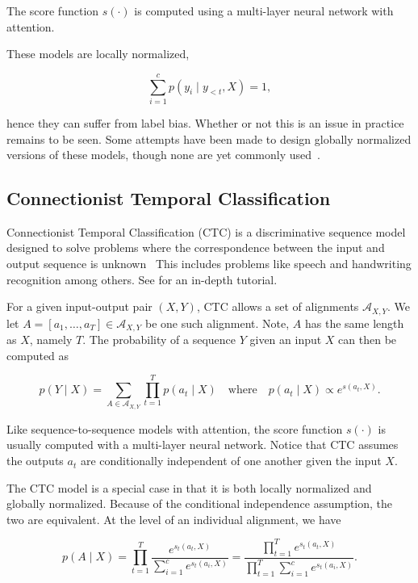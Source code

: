 \documentclass[11pt, letterpaper]{article}
\newcommand{\A}{\mathcal{A}}
\begin{document}
The score function $s(\cdot)$ is computed using a multi-layer neural network
with attention.

These models are locally normalized,

\begin{equation}
\sum_{i=1}^c p(y_i \mid y_{<t}, X) = 1,
\end{equation}

hence they can suffer from label bias. Whether or not this is an issue in
practice remains to be seen. Some attempts have been made to design globally
normalized versions of these models, though none are yet commonly
used~\citep{wiseman2016}.

\subsection{Connectionist Temporal Classification}

Connectionist Temporal Classification (CTC) is a discriminative sequence model
designed to solve problems where the correspondence between the input and
output sequence is unknown~\citep{graves2006} This includes problems like speech
and handwriting recognition among others. See \citet{hannun2017} for an
in-depth tutorial.

For a given input-output pair $(X, Y)$, CTC allows a set of alignments
$\A_{X,Y}$. We let $A\!=\![a_1, \ldots, a_T] \in \A_{X,Y}$ be one such alignment.
Note, $A$ has the same length as $X$, namely $T$. The probability of a sequence
$Y$ given an input $X$ can then be computed as

\begin{equation}
    p(Y \mid X) = \sum_{A \in \A_{X,Y}} \prod_{t=1}^T p(a_t \mid X)
     \quad \textrm{where} \quad p(a_t \mid X) \propto e^{s(a_t, X)}.
\end{equation}

Like sequence-to-sequence models with attention, the score function $s(\cdot)$
is usually computed with a multi-layer neural network. Notice that CTC assumes
the outputs $a_t$ are conditionally independent of one another given the input
$X$.

The CTC model is a special case in that it is both locally normalized and
globally normalized. Because of the conditional independence assumption, the
two are equivalent. At the level of an individual alignment, we have

\begin{equation}
p(A \mid X) = \prod_{t=1}^T \frac{e^{s_t(a_t, X)}}{\sum_{i=1}^c e^{s_t(a_i, X)}}
    = \frac{\prod_{t=1}^T e^{s_t(a_t, X)}}{\prod_{t=1}^T \sum_{i=1}^c e^{s_t(a_i, X)}}.
\end{equation}
\end{document}
